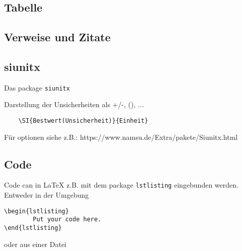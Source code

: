 \documentclass[twoside, 11pt, ngerman, a4paper, biblography=totoc]{scrartcl}
\begin{document}
\subsection{Tabelle}

\subsection{Verweise und Zitate}
\subsection{siunitx}
Das package \texttt{siunitx} 

Darstellung der Unsicherheiten als +/-, (), ...
\begin{verbatim}
	\SI{Bestwert(Unsicherheit)}{Einheit}
\end{verbatim}


Für optionen siehe z.B.: https://www.namsu.de/Extra/pakete/Siunitx.html

\subsection{Code}
Code can in LaTeX z.B. mit dem package \texttt{lstlisting} eingebunden werden. Entweder in der Umgebung
\begin{verbatim}
\begin{lstlisting}
		Put your code here.
\end{lstlisting}
\end{verbatim}
oder aus einer Datei 
\begin{verbatim}
		
\end{verbatim}
\end{document}
